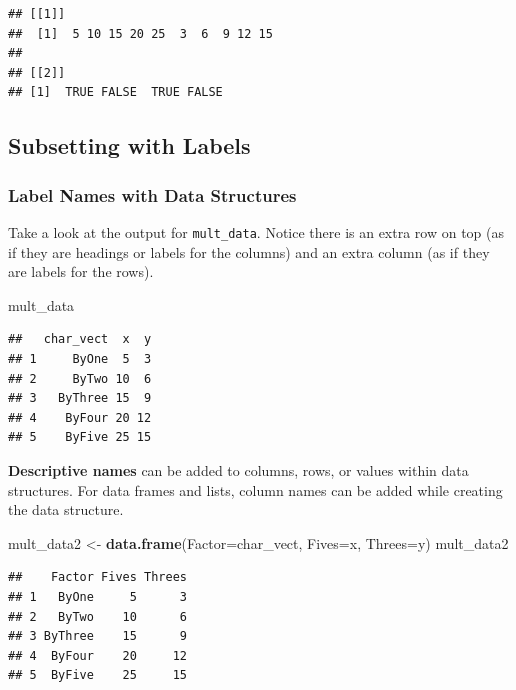\documentclass[
]{book}
\newenvironment{Shaded}{\begin{snugshade}}{\end{snugshade}}
\newcommand{\AttributeTok}[1]{\textcolor[rgb]{0.13,0.29,0.53}{#1}}
\newcommand{\FunctionTok}[1]{\textcolor[rgb]{0.13,0.29,0.53}{\textbf{#1}}}
\newcommand{\NormalTok}[1]{#1}
\newcommand{\OtherTok}[1]{\textcolor[rgb]{0.56,0.35,0.01}{#1}}
\theoremstyle{definition}
\theoremstyle{definition}
\theoremstyle{definition}
\theoremstyle{definition}
\theoremstyle{remark}
\begin{document}
\begin{verbatim}
## [[1]]
##  [1]  5 10 15 20 25  3  6  9 12 15
## 
## [[2]]
## [1]  TRUE FALSE  TRUE FALSE
\end{verbatim}

\hypertarget{subsetting-with-labels}{%
\subsection{Subsetting with Labels}\label{subsetting-with-labels}}

\hypertarget{label-names-with-data-structures}{%
\subsubsection{Label Names with Data Structures}\label{label-names-with-data-structures}}

Take a look at the output for \texttt{mult\_data}. Notice there is an extra row on top (as if they are headings or labels for the columns) and an extra column (as if they are labels for the rows).

\begin{Shaded}
\begin{Highlighting}[]
\NormalTok{mult\_data}
\end{Highlighting}
\end{Shaded}

\begin{verbatim}
##   char_vect  x  y
## 1     ByOne  5  3
## 2     ByTwo 10  6
## 3   ByThree 15  9
## 4    ByFour 20 12
## 5    ByFive 25 15
\end{verbatim}

\textbf{Descriptive names} can be added to columns, rows, or values within data structures. For data frames and lists, column names can be added while creating the data structure.

\begin{Shaded}
\begin{Highlighting}[]
\NormalTok{mult\_data2 }\OtherTok{\textless{}{-}} \FunctionTok{data.frame}\NormalTok{(}\AttributeTok{Factor=}\NormalTok{char\_vect, }\AttributeTok{Fives=}\NormalTok{x, }\AttributeTok{Threes=}\NormalTok{y)}
\NormalTok{mult\_data2}
\end{Highlighting}
\end{Shaded}

\begin{verbatim}
##    Factor Fives Threes
## 1   ByOne     5      3
## 2   ByTwo    10      6
## 3 ByThree    15      9
## 4  ByFour    20     12
## 5  ByFive    25     15
\end{verbatim}
\end{document}
